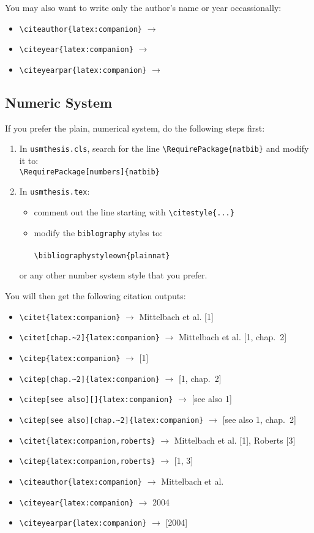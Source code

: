 You may also want to write only the author's name or year occassionally:

\begin{itemize}[nosep]
\item \verb|\citeauthor{latex:companion}| $\to$ \citeauthor{latex:companion}
\item \verb|\citeyear{latex:companion}| $\to$ \citeyear{latex:companion}
\item \verb|\citeyearpar{latex:companion}| $\to$ \citeyearpar{latex:companion}
\end{itemize}

\subsection{Numeric System}

If you prefer the plain, numerical system, do the following steps first:
\begin{enumerate}[nosep]
  \item In \texttt{usmthesis.cls}, search for the line \verb|\RequirePackage{natbib}| and modify it to:\\
  \verb|\RequirePackage[numbers]{natbib}|
  \item In \texttt{usmthesis.tex}:
  \begin{itemize}[nosep]
    \item comment out the line starting with \verb|\citestyle{...}|
    \item modify the \verb|biblography| styles to: \\
      \verb|| \\
      \verb|\bibliographystyleown{plainnat}|
    \end{itemize}
    or any other number system style that you prefer.
\end{enumerate}

You will then get the following citation outputs: 


\begin{itemize}[nosep]
\item \verb|\citet{latex:companion}| $\to$ Mittelbach et al. [1]
\item \verb|\citet[chap.~2]{latex:companion}| $\to$ Mittelbach et al. [1, chap.~2]
\item \verb|\citep{latex:companion}| $\to$ [1]
\item \verb|\citep[chap.~2]{latex:companion}| $\to$ [1, chap.~2]
\item \verb|\citep[see also][]{latex:companion}| $\to$ [see also 1]
\item \verb|\citep[see also][chap.~2]{latex:companion}| $\to$ [see also 1, chap.~2]
\item \verb|\citet{latex:companion,roberts}| $\to$ Mittelbach et al. [1], Roberts [3]
\item \verb|\citep{latex:companion,roberts}| $\to$ [1, 3]
\item \verb|\citeauthor{latex:companion}| $\to$ Mittelbach et al.
\item \verb|\citeyear{latex:companion}| $\to$ 2004
\item \verb|\citeyearpar{latex:companion}| $\to$ [2004]
\end{itemize}

